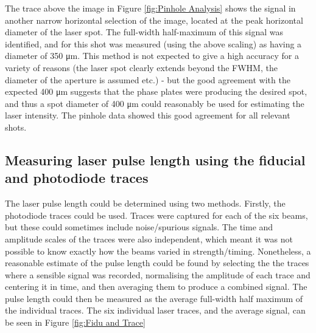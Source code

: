 The trace above the image in Figure \ref{fig:Pinhole Analysis} shows the signal in another narrow horizontal selection of the image, located at the peak horizontal diameter of the laser spot. The full-width half-maximum of this signal was identified, and for this shot was measured (using the above scaling) as having a diameter of 350 \unit{\micro\meter}. This method is not expected to give a high accuracy for a variety of reasons (the laser spot clearly extends beyond the FWHM, the diameter of the aperture is assumed etc.) - but the good agreement with the expected 400 \unit{\micro\meter} suggests that the phase plates were producing the desired spot, and thus a spot diameter of 400 \unit{\micro\meter} could reasonably be used for estimating the laser intensity. The pinhole data showed this good agreement for all relevant shots.

\subsection{Measuring laser pulse length using the fiducial and photodiode traces} \label{Estimating pulse length}

The laser pulse length could be determined using two methods. Firstly, the photodiode traces could be used. Traces were captured for each of the six beams, but these could sometimes include noise/spurious signals. The time and amplitude scales of the traces were also independent, which meant it was not possible to know exactly how the beams varied in strength/timing. Nonetheless, a reasonable estimate of the pulse length could be found by selecting the the traces where a sensible signal was recorded, normalising the amplitude of each trace and centering it in time, and then averaging them to produce a combined signal. The pulse length could then be measured as the average full-width half maximum of the individual traces. The six individual laser traces, and the average signal, can be seen in Figure \ref{fig:Fidu and Trace} 

